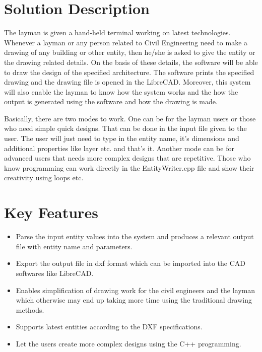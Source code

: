 \section{Solution Description}
The layman is given a hand-held terminal working on latest technologies. Whenever a layman or any person related to Civil Engineering need to make a drawing of any building or other entity, then he/she is asked to give the entity or the drawing related details. On the basis of these details, the software will be able to draw the design of the specified architecture.  The software prints the specified drawing and the drawing file is opened in the LibreCAD.
Moreover, this system will also enable the layman to know how the system works and the how the output is generated using the software and how the drawing is made.

Basically, there are two modes to work. One can be for the layman users or those who need simple quick designs. That can be done in the input file given to the user. The user will just need to type in the entity name, it's dimensions and additional properties like layer etc. and that's it. Another mode can be for advanced users that needs more complex designs that are repetitive. Those who know programming can work directly in the EntityWriter.cpp file and show their creativity using loops etc.

\section{Key Features}
\begin{itemize}
\item Parse the input entity values into the system and produces a relevant output file with entity name and parameters.
\item Export the output file in dxf format which can be imported into the CAD softwares like LibreCAD.
\item Enables simplification of drawing work for the civil engineers and the layman which otherwise may end up taking more time using the traditional drawing methods.
\item Supports latest entities according to the DXF specifications.
\item Let the users create more complex designs using the C++ programming. 
\end{itemize}
